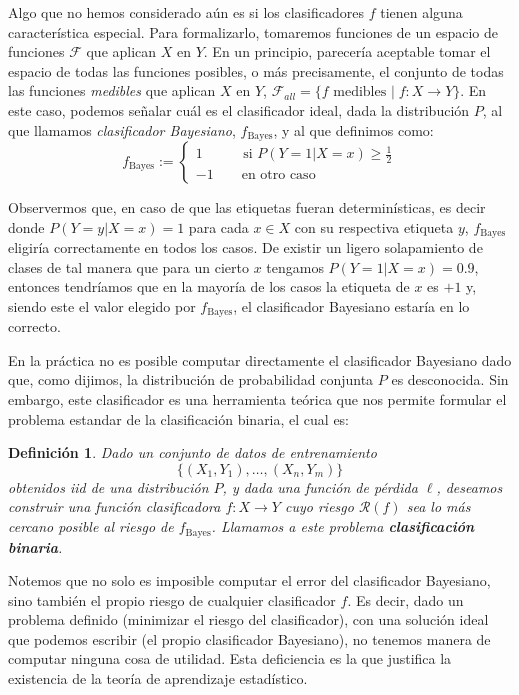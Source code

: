 \documentclass{report}
\newtheorem{dfn}{Definición}[section]
\begin{document}
Algo que no hemos considerado aún es si los clasificadores $f$ tienen alguna característica especial. Para formalizarlo, tomaremos funciones de un
espacio de funciones $\mathcal{F}$ que aplican $X$ en $Y$. En un principio, parecería aceptable tomar el espacio de todas las funciones posibles, o 
más precisamente, el conjunto de todas las funciones \textit{medibles} que aplican $X$ en $Y$, $\mathcal{F}_{all} = \{f \text{ medibles  } | 
\; f: X \rightarrow Y \}$. En este caso, podemos señalar cuál es el clasificador ideal, dada la distribución $P$, al que llamamos
\textit{clasificador Bayesiano}, $f_{\text{Bayes}}$, y al que definimos como:
\[
f_{\text{Bayes}} := \begin{cases}
1 \qquad \; \; \text{  si } P(Y=1 | X=x) \geq \frac{1}{2}\\
-1 \qquad \text{en otro caso }
\end{cases}
\]

Observermos que, en caso de que las etiquetas fueran determinísticas, es decir donde $P(Y=y|X=x)=1$ para cada $x\in X$ con su
respectiva etiqueta $y$, $f_{\text{Bayes}}$ eligiría correctamente en todos los casos. De existir un ligero solapamiento de clases 
de tal manera que para un cierto $x$ tengamos $P(Y=1|X=x) = 0.9$, entonces tendríamos
que en la mayoría de los casos la etiqueta de $x$ es $+1$ y, siendo este el valor elegido por $f_{\text{Bayes}}$, el clasificador
Bayesiano estaría en lo correcto.

En la práctica no es posible computar directamente el clasificador Bayesiano dado que, como dijimos, la distribución de probabilidad
conjunta $P$ es desconocida. Sin embargo, este clasificador es una herramienta teórica que nos permite formular el problema
estandar de la clasificación binaria, el cual es:\newline

\begin{dfn}
Dado un conjunto de datos de entrenamiento 
$$ \{ (X_1,Y_1), \dots ,(X_n, Y_m)\}$$ 
obtenidos iid de una distribución $P$, y dada una función de pérdida $\ell$, deseamos construir una función clasificadora 
$f:X\rightarrow Y$ cuyo riesgo $\mathcal{R}(f)$ sea lo más cercano posible al riesgo de $f_{\text{Bayes}}$. Llamamos a este problema
\textbf{clasificación binaria}.
\end{dfn}

Notemos que no solo es imposible computar el error del clasificador Bayesiano, sino también el propio riesgo de cualquier clasificador
$f$. Es decir, dado un problema definido (minimizar el riesgo del clasificador), con una solución ideal que podemos escribir (el propio
clasificador Bayesiano), no tenemos manera de computar ninguna cosa de utilidad. Esta deficiencia es la que justifica la existencia de 
 la teoría de aprendizaje estadístico.\newline
\end{document}
